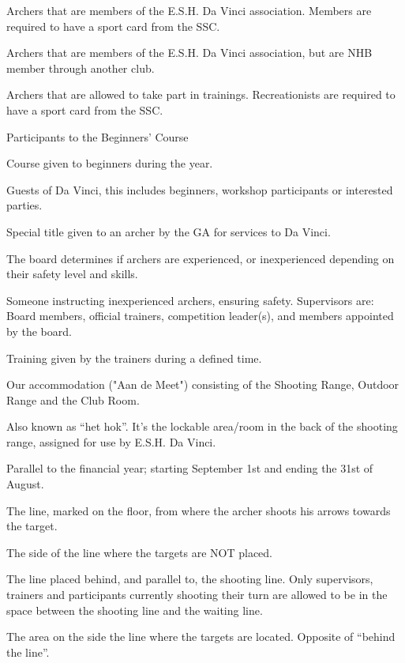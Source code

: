 \documentclass[a4paper]{article}
\begin{document}
\begin{description}[font=\sffamily\bfseries, leftmargin=1cm, style=nextline]
\item[Member]
Archers that are members of the E.S.H. Da Vinci association. Members are required to have a sport card from the SSC.
\item[External Member]
Archers that are members of the E.S.H. Da Vinci association, but are NHB member through another club.
\item[Recreationist]
Archers that are allowed to take part in trainings. Recreationists are required to have a sport card from the SSC.
\item[Beginner]
Participants to the Beginners' Course
\item[Beginners' Course] Course given to beginners during the year.
\item[Guest] Guests of Da Vinci, this includes beginners, workshop participants or interested parties.
\item[Honorary Member] Special title given to an archer by the GA for services to Da Vinci.
\item[Experienced - Inexperienced] The board determines if archers are experienced, or inexperienced depending on their safety level and skills.
\item[Supervisor] Someone instructing inexperienced archers, ensuring safety. Supervisors are: Board members, official trainers, competition leader(s), and members appointed by the board.
\item[General Training] Training given by the trainers during a defined time.

\item[Accommodation] Our accommodation ("Aan de Meet") consisting of the Shooting Range, Outdoor Range and the Club Room.
\item[Club Room] Also known as “het hok”. It’s the lockable area/room in the back of the shooting range, assigned for use by E.S.H. Da Vinci.
    \item[Association Year]
    Parallel to the financial year; starting September 1st and ending the 31st of August. 
    
    \item[Shooting line]
    The line, marked on the floor, from where the archer shoots his arrows towards the target.
    \item[“Behind the line”]
    The side of the line where the targets are NOT placed. 
    \item[Waiting line]
The line placed behind, and parallel to, the shooting line. Only supervisors, trainers and participants currently shooting their turn are allowed to be in the space between the shooting line and the waiting line. 


\item[Downrange of the line] The area on the side the line where the targets are located. Opposite of ``behind the line''.

\end{description}
\end{document}
